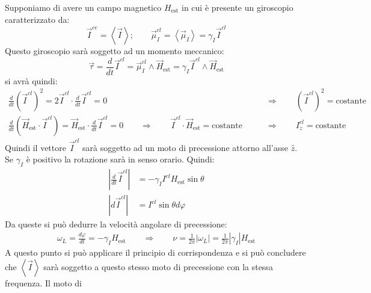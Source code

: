 Supponiamo di avere un campo magnetico $H_\text{est}$ in cui è presente un 
giroscopio caratterizzato da:
\begin{equation}
\vec{I}^{ce} = \left\langle \vec{I} \right\rangle; \qquad \vec{\mu}_I^{cl} = 
\left\langle \vec{\mu}_I \right\rangle = \gamma_I \vec{I}^{cl}
\end{equation}
Questo giroscopio sarà soggetto ad un momento meccanico:
\begin{equation}
\vec{\tau} = \frac{d}{dt}\vec{I}^{cl} = \vec{\mu}_I^{cl} \wedge 
\vec{H}_\text{est} = \gamma_I \vec{I}^{cl} \wedge \vec{H}_\text{est}
\end{equation}
si avrà quindi:
\begin{equation}\begin{split}
\frac{d}{dt} (\vec{I}^{cl})^{2} = 2 \vec{I}^{cl} \cdot \frac{d}{dt} 
\vec{I}^{cl} = 0 \qquad &\Rightarrow \qquad (\vec{I}^{cl})^{2} = 
\text{costante}\\
\frac{d}{dt} (\vec{H}_\text{est} \cdot \vec{I}^{cl}) = \vec{H}_\text{est} \cdot 
\frac{d}{dt} \vec{I}^{cl} = 0 \qquad \Rightarrow \qquad \vec{I}^{cl} \cdot 
\vec{H}_\text{est} = \text{costante} \qquad &\Rightarrow \qquad I_z^{cl} = 
\text{costante}
\end{split}\end{equation}
Quindi il vettore $\vec{I}^{cl}$ sarà soggetto ad un moto di precessione 
attorno all'asse $\hat{z}$. Se $\gamma_I$ è positivo la rotazione sarà in 
senso orario. Quindi:
\begin{equation}
\begin{split}
\left| \frac{d}{dt} \vec{I}^{cl} \right| &= - \gamma_I I^{cl}H_\text{est} \sin 
\theta\\
\left| d \vec{I}^{cl} \right| &= I^{cl} \sin \theta d\varphi
\end{split}
\end{equation}
Da queste si può dedurre la velocità angolare di precessione:
\begin{equation}
\begin{split}
\omega_L = \frac{d \varphi}{dt} = - \gamma_I H_\text{est} \qquad \Rightarrow 
\qquad \nu = \frac{1}{2 \pi} \left|\omega_L \right| = \frac{1}{2 \pi} \left| 
\gamma_I \right| H_\text{est}
\end{split}
\end{equation}
A  questo punto si può applicare il principio di
corrispondenza e si può concludere che $\left\langle \vec{I} \right\rangle$ 
sarà
soggetto a questo stesso moto di precessione con la stessa frequenza. Il moto di
